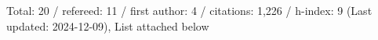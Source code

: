 Total: 20 / refereed: 11 / first author: 4 / citations: 1,226 / h-index: 9 (Last updated: 2024-12-09), List attached below